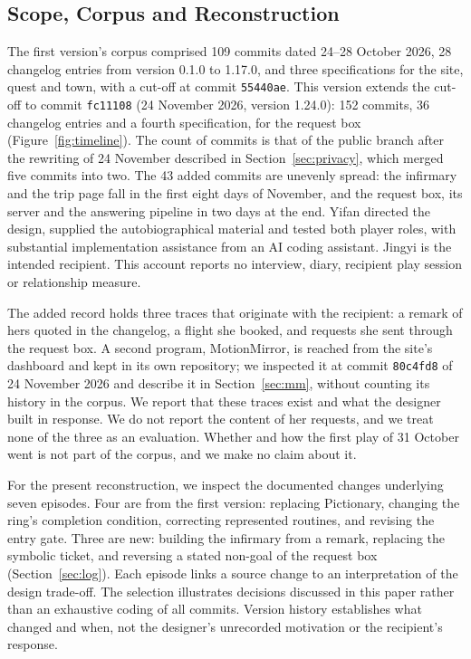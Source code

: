 \documentclass[sigconf,nonacm]{acmart}
\newcommand{\code}[1]{\textnormal{\texttt{\small #1}}}
\begin{document}
\subsection{Scope, Corpus and Reconstruction}
The first version's corpus comprised 109 commits dated 24--28 October 2026, 28 changelog entries
from version 0.1.0 to 1.17.0, and three specifications for the site, quest and town, with a
cut-off at commit \code{55440ae}. This version extends the cut-off to commit \code{fc11108}
(24 November 2026, version 1.24.0): 152 commits, 36 changelog entries and a fourth specification,
for the request box (Figure~\ref{fig:timeline}). The count of commits is that of the public branch after the rewriting of
24 November described in Section~\ref{sec:privacy}, which merged five commits into two. The 43
added commits are unevenly spread: the infirmary and the trip page
fall in the first eight days of November, and the request box, its server and the answering
pipeline in two days at the end.
Yifan directed the design, supplied the autobiographical material and tested both player roles,
with substantial implementation assistance from an AI coding assistant. Jingyi is the intended
recipient. This account reports no interview, diary, recipient play session or relationship measure.

The added record holds three traces that originate with the recipient: a remark of hers quoted in
the changelog, a flight she booked, and requests she sent through the request box. A second program, MotionMirror, is reached from the site's dashboard and kept in its own
repository; we inspected it at commit \code{80c4fd8} of 24 November 2026 and describe it in
Section~\ref{sec:mm}, without counting its history in the corpus. We report that
these traces exist and what the designer built in response. We do not report the content of her
requests, and we treat none of the three as an evaluation. Whether and how the first play of
31 October went is not part of the corpus, and we make no claim about it.

For the present reconstruction, we inspect the documented changes underlying seven episodes.
Four are from the first version: replacing Pictionary, changing the ring's completion condition,
correcting represented routines, and revising the entry gate. Three are new: building the
infirmary from a remark, replacing the symbolic ticket, and reversing a stated non-goal of the
request box (Section~\ref{sec:log}). Each episode links a source change to an
interpretation of the design trade-off. The selection illustrates decisions discussed in this
paper rather than an exhaustive coding of all commits. Version history establishes what changed
and when, not the designer's unrecorded motivation or the recipient's response.
\end{document}
